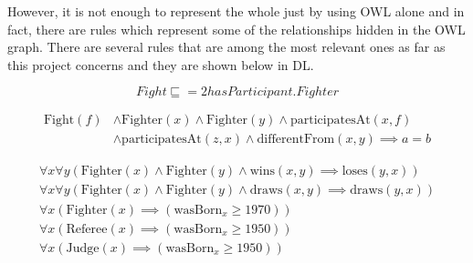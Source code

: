 \documentclass[a4paper]{article}
\begin{document}
However, it is not enough to represent the whole just by using OWL alone and in fact, there are rules which represent some of the relationships hidden in the OWL graph. 
There are several rules that are among the most relevant ones as far as this project concerns and they are shown below in DL.

\begin{equation}	
	Fight \sqsubseteq =2hasParticipant.Fighter
	\label{formula:fight_participants}
\end{equation}


\begin{equation}
	\begin{split}
		\text{Fight}(f) &\land \text{Fighter}(x) \land \text{Fighter}(y) \land \text{participatesAt}(x, f) \\
						&\land \text{participatesAt}(z, x) \land \text{differentFrom}(x, y) \implies a = b
	\end{split}
	\label{formula:fighter_weights}
\end{equation}


\begin{align}
	\forall x \forall y (\text{Fighter}(x) \land \text{Fighter}(y) \land \text{wins}(x, y) \implies \text{loses}(y, x)) \\
	\forall x \forall y (\text{Fighter}(x) \land \text{Fighter}(y) \land \text{draws}(x, y) \implies \text{draws}(y, x)) \\
	\forall x (\text{Fighter}(x) \implies (\text{wasBorn}_{x} \geq 1970)) \\
	\forall x (\text{Referee}(x) \implies (\text{wasBorn}_{x} \geq 1950)) \\
	\forall x (\text{Judge}(x) \implies (\text{wasBorn}_{x} \geq 1950))
	\label{formula:mma_axioms}
\end{align}
\end{document}
